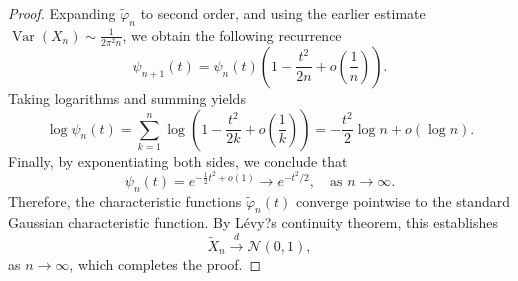 \documentclass[10pt,a4paper]{amsart}
\begin{document}
\begin{proof}
	Expanding \( \widetilde{\varphi}_n \) to second order, and using the earlier estimate \( \operatorname{Var}(X_n) \sim \frac{1}{2\pi^2 n} \), we obtain the following recurrence
	\begin{equation}
		\psi_{n+1}(t) = \psi_n(t) \left(1 - \frac{t^2}{2n} + o\left(\frac{1}{n}\right) \right).
	\end{equation}
	Taking logarithms and summing yields
	\begin{equation}
		\log \psi_n(t) = \sum_{k=1}^n \log \left(1 - \frac{t^2}{2k} + o\left(\frac{1}{k} \right) \right) = -\frac{t^2}{2} \log n + o(\log n).
	\end{equation}
	Finally, by exponentiating both sides, we conclude that
	\begin{equation}
		\psi_n(t) = e^{ -\frac{1}{2}t^2 + o(1) } \longrightarrow e^{-t^2/2}, \quad \text{as } n \to \infty.
	\end{equation}
	Therefore, the characteristic functions \( \widetilde{\varphi}_n(t) \) converge pointwise to the standard Gaussian characteristic function. By L\'evy?s continuity theorem, this establishes
	\begin{equation}
		\widetilde{X}_n \xrightarrow{d} \mathcal{N}(0,1),
	\end{equation}
	as \( n \to \infty \), which completes the proof.
\end{proof}
\end{document}
